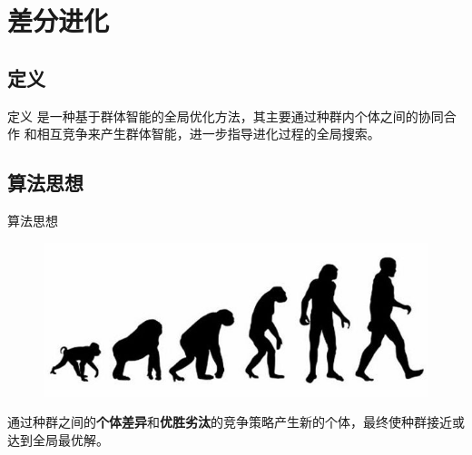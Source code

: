 ﻿%
%

\section{差分进化}\fontsize{12pt}{12pt}\selectfont

\subsection{定义}
\begin{frame}{定义}
	{}是一种基于群体智能的全局优化方法，其主要通过种群内个体之间的协同合作
		和相互竞争来产生群体智能，进一步指导进化过程的全局搜索。
\end{frame}

\subsection{算法思想}
\begin{frame}{算法思想}
	\begin{figure}
		\includegraphics [width =1.0\textwidth]{../images/evolution.png}
	\end{figure}
	通过种群之间的\textbf{个体差异}和\textbf{优胜劣汰}的竞争策略产生新的个体，最终使种群接近或达到全局最优解。
\end{frame}

